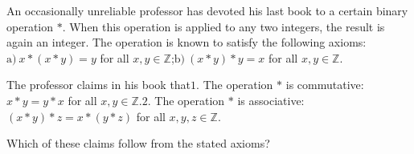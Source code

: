 An occasionally unreliable professor has devoted his last book to a certain binary operation $*$. When this operation is applied to any two integers, the result is again an integer. The operation is known to satisfy the following axioms:$\text{a})\ x*(x*y)=y$ for all $x,y\in\mathbb{Z}$;$\text{b})\ (x*y)*y=x$ for all $x,y\in\mathbb{Z}$.

The professor claims in his book that$1.$ The operation $*$ is commutative: $x*y=y*x$ for all $x,y\in\mathbb{Z}$.$2.$ The operation $*$ is associative: $(x*y)*z=x*(y*z)$ for all $x,y,z\in\mathbb{Z}$.

Which of these claims follow from the stated axioms?